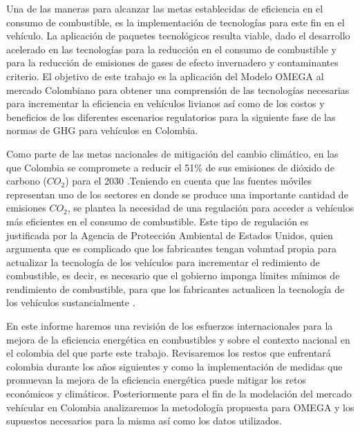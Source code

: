 Una de las maneras para alcanzar las metas establecidas de eficiencia en el consumo de combustible, es la implementación de tecnologías para este fin en el vehículo. La aplicación de paquetes tecnológicos resulta viable, dado el desarrollo acelerado en las tecnologías para la reducción en el consumo de combustible y para la reducción de emisiones de gases de efecto invernadero y contaminantes criterio. El objetivo de este trabajo es la aplicación del Modelo OMEGA al mercado Colombiano para obtener una comprensión de las tecnologías necesarias para incrementar la eficiencia en vehículos livianos así como de los costos y beneficios de los diferentes escenarios regulatorios para la siguiente fase de las normas de GHG para vehículos en Colombia.

Como parte de las metas nacionales de mitigación del cambio climático, en las que Colombia se compromete a reducir el 51\% de sus emisiones de dióxido de carbono ($CO_2$) para el 2030 \cite{Meta_2020}.Teniendo en cuenta que las fuentes móviles representan uno de los sectores en donde se produce una importante cantidad de emisiones $CO_2$, se plantea la necesidad de una regulación para acceder a vehículos más eficientes en el consumo de combustible. Este tipo de regulación es justificada por la Agencia de Protección Ambiental de Estados Unidos, quien argumenta que es complicado que los fabricantes tengan voluntad propia para actualizar la tecnología de los vehículos para incrementar el redimiento de combustible, es decir, es necesario que el gobierno imponga límites mínimos de rendimiento de combustible, para que los fabricantes actualicen la tecnología de los vehículos sustancialmente \cite{EPA_2012-A}. 

En este informe haremos una revisión de los esfuerzos internacionales para la mejora de la eficiencia energética en combustibles y sobre el contexto nacional en el colombia del que parte este trabajo. Revisaremos los restos que enfrentará colombia durante los años siguientes y como la implementación de medidas que promuevan la mejora de la eficiencia energética puede mitigar los retos económicos y climáticos. Posteriormente para el fin de la modelación del mercado vehícular en Colombia analizaremos la metodología propuesta para OMEGA y los supuestos necesarios para la misma así como los datos utilizados.



